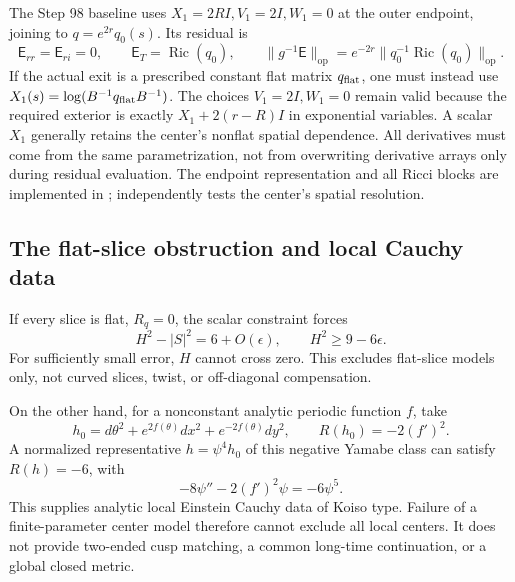 \documentclass[a4paper,11pt]{article}
\numberwithin{equation}{section}
\theoremstyle{definition}
\newcommand{\Ric}{\operatorname{Ric}}
\newcommand{\op}{\mathrm{op}}
\begin{document}
The Step 98 baseline uses $X_1=2RI,V_1=2I,W_1=0$ at the outer endpoint, joining to $q=e^{2r}q_0(s)$. Its residual is
\begin{equation}\label{eq:nonflat-exterior}
 \mathsf E_{rr}=\mathsf E_{ri}=0,\qquad
 \mathsf E_T=\Ric(q_0),\qquad
 \|g^{-1}\mathsf E\|_\op=e^{-2r}\|q_0^{-1}\Ric(q_0)\|_\op.
\end{equation}
If the actual exit is a prescribed constant flat matrix $q_{\rm flat}$, one must instead use $X_1(s)=\log(B^{-1}q_{\rm flat}B^{-1})$.
The choices $V_1=2I,W_1=0$ remain valid because the required exterior is exactly $X_1+2(r-R)I$ in exponential variables. A scalar $X_1$ generally retains the center's nonflat spatial dependence.
All derivatives must come from the same parametrization, not from overwriting derivative arrays only during residual evaluation.
The endpoint representation and all Ricci blocks are implemented in ;  independently tests the center's spatial resolution.

\subsection{The flat-slice obstruction and local Cauchy data}
If every slice is flat, $R_q=0$, the scalar constraint forces
\[
H^2-|S|^2=6+O(\epsilon),\qquad
H^2\ge9-6\epsilon.
\]
For sufficiently small error, $H$ cannot cross zero. This excludes flat-slice models only, not curved slices, twist, or off-diagonal compensation.

On the other hand, for a nonconstant analytic periodic function $f$, take
\[
h_0=d\theta^2+e^{2f(\theta)}dx^2+e^{-2f(\theta)}dy^2,
\qquad R(h_0)=-2(f')^2.
\]
A normalized representative $h=\psi^4h_0$ of this negative Yamabe class can satisfy $R(h)=-6$, with
\[
-8\psi''-2(f')^2\psi=-6\psi^5.
\]
This supplies analytic local Einstein Cauchy data of Koiso type. Failure of a finite-parameter center model therefore cannot exclude all local centers. It does not provide two-ended cusp matching, a common long-time continuation, or a global closed metric.
\end{document}
